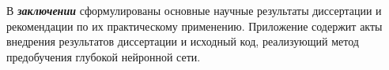 \documentclass{thesisby}
\begin{document}
В \textbf{\textit{заключении}} сформулированы основные научные результаты диссертации и рекомендации по их практическому применению.
Приложение содержит акты внедрения результатов диссертации и исходный код, реализующий метод предобучения глубокой нейронной сети.





\end{document}
